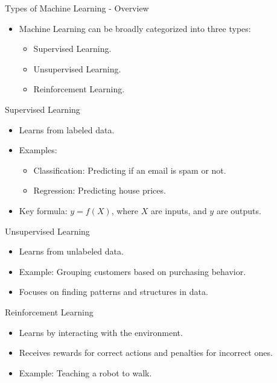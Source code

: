\documentclass{beamer}
\begin{document}
\begin{frame}{Types of Machine Learning - Overview}
\begin{itemize}
    \item Machine Learning can be broadly categorized into three types:
    \begin{itemize}
        \item Supervised Learning.
        \item Unsupervised Learning.
        \item Reinforcement Learning.
    \end{itemize}
\end{itemize}
\end{frame}

\begin{frame}{Supervised Learning}
\begin{itemize}
    \item Learns from labeled data.
    \item Examples:
    \begin{itemize}
        \item Classification: Predicting if an email is spam or not.
        \item Regression: Predicting house prices.
    \end{itemize}
    \item Key formula: $y = f(X)$, where $X$ are inputs, and $y$ are outputs.
\end{itemize}
\end{frame}

\begin{frame}{Unsupervised Learning}
\begin{itemize}
    \item Learns from unlabeled data.
    \item Example: Grouping customers based on purchasing behavior.
    \item Focuses on finding patterns and structures in data.
\end{itemize}
\end{frame}

\begin{frame}{Reinforcement Learning}
\begin{itemize}
    \item Learns by interacting with the environment.
    \item Receives rewards for correct actions and penalties for incorrect ones.
    \item Example: Teaching a robot to walk.
\end{itemize}
\end{frame}
\end{document}
